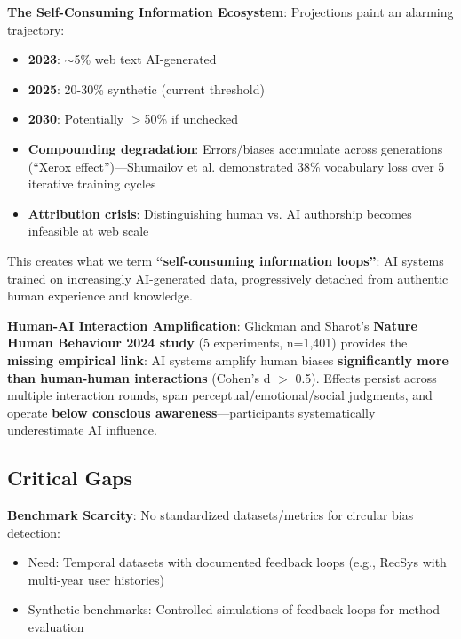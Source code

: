 \documentclass[11pt,a4paper]{article}
\begin{document}
\textbf{The Self-Consuming Information Ecosystem}:
Projections paint an alarming trajectory:
\begin{itemize}
    \item \textbf{2023}: $\sim$5\% web text AI-generated  
    \item \textbf{2025}: 20-30\% synthetic (current threshold)  
    \item \textbf{2030}: Potentially $>$50\% if unchecked  
    \item \textbf{Compounding degradation}: Errors/biases accumulate across generations (``Xerox effect'')—Shumailov et al. \cite{shumailov2024} demonstrated 38\% vocabulary loss over 5 iterative training cycles
    \item \textbf{Attribution crisis}: Distinguishing human vs. AI authorship becomes infeasible at web scale
\end{itemize}

This creates what we term \textbf{``self-consuming information loops''}: AI systems trained on increasingly AI-generated data, progressively detached from authentic human experience and knowledge.

\textbf{Human-AI Interaction Amplification}:
Glickman and Sharot's \cite{glickman2024} \textbf{Nature Human Behaviour 2024 study} (5 experiments, n=1,401) provides the \textbf{missing empirical link}: AI systems amplify human biases \textbf{significantly more than human-human interactions} (Cohen's d $>$ 0.5). Effects persist across multiple interaction rounds, span perceptual/emotional/social judgments, and operate \textbf{below conscious awareness}—participants systematically underestimate AI influence.

\subsection{Critical Gaps}

\textbf{Benchmark Scarcity}:  
No standardized datasets/metrics for circular bias detection:
\begin{itemize}
    \item Need: Temporal datasets with documented feedback loops (e.g., RecSys with multi-year user histories)  
    \item Synthetic benchmarks: Controlled simulations of feedback loops for method evaluation
\end{itemize}
\end{document}
